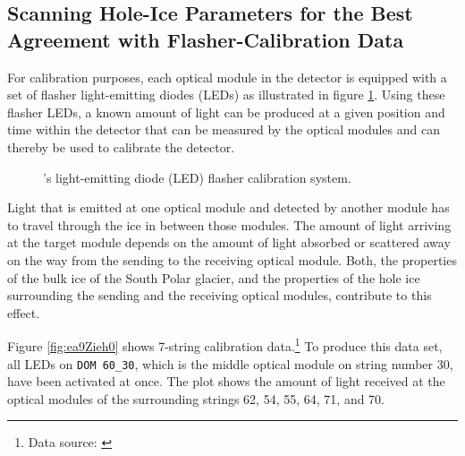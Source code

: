 
\subsection{Scanning Hole-Ice Parameters for the Best Agreement with Flasher-Calibration Data}
\label{sec:flasher}

For calibration purposes, each optical module in the \icecube detector is equipped with a set of flasher light-emitting diodes (LEDs) as illustrated in figure \ref{fig:Quee3yui}. Using these flasher LEDs, a known amount of light can be produced at a given position and time within the detector that can be measured by the optical modules and can thereby be used to calibrate the detector. \cite{icepaper}

\begin{figure}[htbp]
  \hfill
  \caption{\icecube's light-emitting diode (LED) flasher calibration system.}
  \label{fig:Quee3yui}
\end{figure}

Light that is emitted at one optical module and detected by another module has to travel through the ice in between those modules. The amount of light arriving at the target module depends on the amount of light absorbed or scattered away on the way from the sending to the receiving optical module. Both, the properties of the bulk ice of the South Polar glacier, and the properties of the hole ice surrounding the sending and the receiving optical modules, contribute to this effect.

Figure \ref{fig:ea9Zieh0} shows 7-string calibration data.\footnote{Data source: \cite{flasherdata}} To produce this data set, all LEDs on \texttt{DOM 60\_30}, which is the middle optical module on string number 30, have been activated at once. The plot shows the amount of light received at the optical modules of the surrounding strings 62, 54, 55, 64, 71, and 70.

